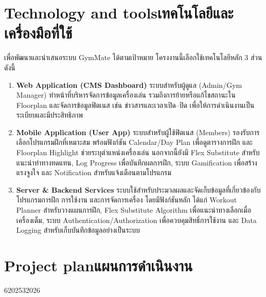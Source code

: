 \section{\ifenglish Technology and tools\else เทคโนโลยีและเครื่องมือที่ใช้\fi}
\enskip เพื่อพัฒนาและนำเสนอระบบ GymMate ได้ตามเป้าหมาย โครงงานนี้เลือกใช้เทคโนโลยีหลัก 3 ส่วน ดังนี้

\begin{enumerate}
\renewcommand{\labelenumi}{1.6.\arabic{enumi}}
    \item \textbf{Web Application (CMS Dashboard)}
    ระบบสำหรับผู้ดูแล (Admin/Gym Manager) ทำหน้าที่บริหารจัดการข้อมูลเครื่องเล่น รวมถึงการย้ายหรือแก้ไขสถานะใน Floorplan และจัดการข้อมูลฟิตเนส เช่น ข่าวสารและเวลาเปิด--ปิด เพื่อให้การดำเนินงานเป็นระเบียบและมีประสิทธิภาพ

    \item \textbf{Mobile Application (User App)}
    ระบบสำหรับผู้ใช้ฟิตเนส (Members) รองรับการเลือกโปรแกรมฝึกที่เหมาะสม พร้อมฟังก์ชัน Calendar/Day Plan เพื่อดูตารางการฝึก และ Floorplan Highlight ช่วยระบุตำแหน่งเครื่องเล่น นอกจากนี้ยังมี Flex Substitute สำหรับแนะนำท่าทางทดแทน, Log Progress เพื่อบันทึกผลการฝึก, ระบบ Gamification เพื่อสร้างแรงจูงใจ และ Notification สำหรับแจ้งเตือนตามโปรแกรม

    \item \textbf{Server \& Backend Services}
    ระบบใช้สำหรับประมวลผลและจัดเก็บข้อมูลที่เกี่ยวข้องกับโปรแกรมการฝึก การใช้งาน และการจัดการเครื่อง โดยมีฟังก์ชันหลัก ได้แก่ Workout Planner สำหรับวางแผนการฝึก, Flex Substitute Algorithm เพื่อแนะนำทางเลือกเมื่อเครื่องเต็ม, ระบบ Authentication/Authorization เพื่อควบคุมสิทธิ์การใช้งาน และ Data Logging สำหรับเก็บบันทึกข้อมูลอย่างเป็นระบบ
\end{enumerate}

\section{\ifenglish Project plan\else แผนการดำเนินงาน\fi}

\begin{plan}{6}{2025}{3}{2026}
\end{plan}

